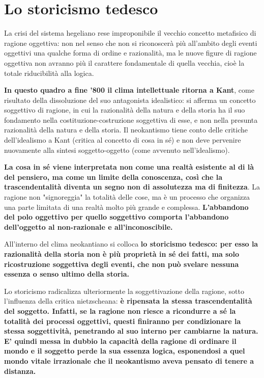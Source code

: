 \chapter{Lo storicismo tedesco}

La crisi del sistema hegeliano rese improponibile il vecchio concetto metafisico di ragione oggettiva: non nel senso che non si riconoscerà più all'ambito degli eventi oggettivi una qualche forma di ordine e razionalità, ma le nuove figure di ragione oggettiva non avranno più il carattere fondamentale di quella vecchia, cioè la totale riducibilità alla logica.

\textbf{In questo quadro a fine '800 il clima intellettuale ritorna a Kant}, come risultato della dissoluzione del suo antagonista idealistico: si afferma un concetto soggettivo di ragione, in cui la razionalità della natura e della storia ha il suo fondamento nella costituzione-costruzione soggettiva di esse, e non nella presunta razionalità della natura e della storia.
Il neokantismo tiene conto delle critiche dell'idealismo a Kant (critica al concetto di cosa in sé) e non deve pervenire nuovamente alla sintesi soggetto-oggetto (come avvenuto nell'idealismo).

\textbf{La cosa in sé viene interpretata non come una realtà esistente al di là del pensiero, ma come un limite della conoscenza, così che la trascendentalità diventa un segno non di assolutezza ma di finitezza}. La ragione non "signoreggia" la totalità delle cose, ma è un processo che organizza una parte limitata di una realtà molto più grande e complessa. \textbf{L'abbandono del polo oggettivo per quello soggettivo comporta l'abbandono dell'oggetto al non-razionale e all'inconoscibile.}

All'interno del clima neokantiano si colloca \textbf{lo storicismo tedesco: per esso la razionalità della storia non è più proprietà in sé dei fatti, ma solo ricostruzione soggettiva degli eventi, che non può svelare nessuna essenza  o senso ultimo della storia.}

Lo storicismo radicalizza ulteriormente la soggettivazione della ragione, sotto l'influenza della critica nietzscheana: \textbf{è ripensata la stessa trascendentalità del soggetto. Infatti, se la ragione non riesce a ricondurre a sé la totalità dei processi oggettivi, questi finiranno per condizionare la stessa soggettività, penetrando al suo interno per cambiarne la natura. E' quindi messa in dubbio la capacità della ragione di ordinare il mondo e il soggetto perde la sua essenza logica, esponendosi a quel mondo vitale irrazionale che il neokantismo aveva pensato di tenere a distanza.}

